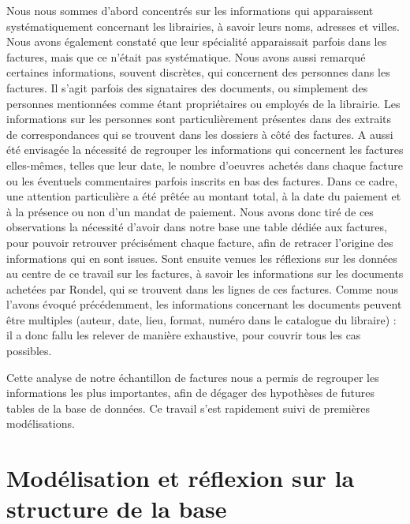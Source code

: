 Nous nous sommes d'abord concentrés sur les informations qui apparaissent systématiquement concernant les librairies, à savoir leurs noms, adresses et villes. Nous avons également constaté que leur spécialité apparaissait parfois dans les factures, mais que ce n'était pas systématique. 
Nous avons aussi remarqué certaines informations, souvent discrètes, qui concernent des personnes dans les factures. Il s'agit parfois des signataires des documents, ou simplement des personnes mentionnées comme étant propriétaires ou employés de la librairie. Les informations sur les personnes sont particulièrement présentes dans des extraits de correspondances qui se trouvent dans les dossiers à côté des factures. A aussi été envisagée la nécessité de regrouper les informations qui concernent les factures elles-mêmes, telles que leur date, le nombre d'oeuvres achetés dans chaque facture ou les éventuels commentaires parfois inscrits en bas des factures. Dans ce cadre, une attention particulière a été prêtée au montant total, à la date du paiement et à la présence ou non d'un mandat de paiement. Nous avons donc tiré de ces observations la nécessité d'avoir dans notre base une table dédiée aux factures, pour pouvoir retrouver précisément chaque facture, afin de retracer l'origine des informations qui en sont issues. Sont ensuite venues les réflexions sur les données au centre de ce travail sur les factures, à savoir les informations sur les documents achetées par Rondel, qui se trouvent dans les lignes de ces factures. Comme nous l'avons évoqué précédemment, les informations concernant les documents peuvent être multiples (auteur, date, lieu, format, numéro dans le catalogue du libraire) : il a donc fallu les relever de manière exhaustive, pour couvrir tous les cas possibles.

Cette analyse de notre échantillon de factures nous a permis de regrouper les informations les plus importantes, afin de dégager des hypothèses de futures tables de la base de données. Ce travail s'est rapidement suivi de premières modélisations. 

\section{Modélisation et réflexion sur la structure de la base}


